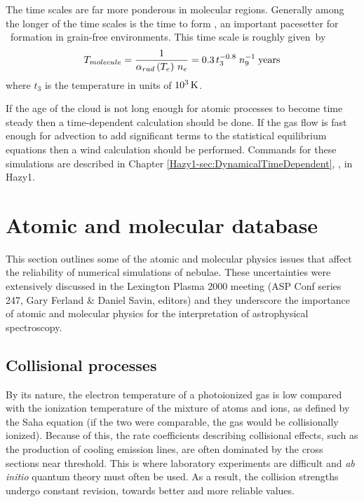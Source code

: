 The time scales are far more ponderous in molecular regions.
Generally
among the longer of the time scales is the time to form \hminus,
an important
pacesetter for \htwo\ formation in grain-free environments.
This time scale is roughly given~by
\begin{equation}
T_{molecule}  = {1 \over {\alpha _{rad} \left( {T_e } \right)\,n_e }} =
0.3\,t_3^{ - 0.8} \;n_9^{ - 1} \;{\mathrm{years}}%
\end{equation}
where $t_3$ is the temperature in units of $10^3 {\rm\thinspace K}$.

If the age of the cloud is not long enough for atomic processes
to become time steady then a time-dependent calculation should
be done.
If the gas flow is fast enough for advection to add significant
terms to the statistical equilibrium equations then a wind 
calculation should be performed.
Commands for these simulations are described in Chapter
\ref{Hazy1-sec:DynamicalTimeDependent},
,
in Hazy1.

\section{Atomic and molecular database}

This section outlines some of the atomic and molecular physics issues
that affect the reliability of numerical simulations of nebulae.
These
uncertainties were extensively discussed in the
Lexington Plasma 2000 meeting
(ASP Conf series 247,
Gary Ferland \& Daniel Savin, editors) and they underscore the importance
of atomic and molecular physics for the interpretation of astrophysical
spectroscopy.

\subsection{Collisional processes}

By its nature, the electron temperature of a photoionized gas is low
compared with the ionization temperature of the mixture of atoms and ions,
as defined by the Saha equation (if the two were comparable, the gas would
be collisionally ionized).
Because of this, the rate coefficients describing
collisional effects, such as the production of cooling emission lines, are
often dominated by the cross sections near threshold.  This is where
laboratory experiments are difficult and \emph{ab initio} quantum theory
must often be used.
As a result, the collision strengths undergo constant revision,
towards better and more reliable values.

